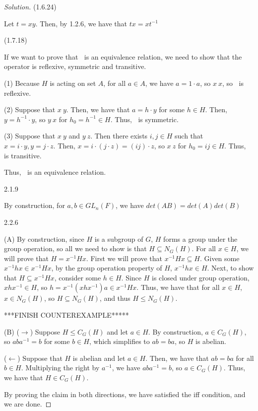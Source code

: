 \documentclass[11 pt]{article}
\theoremstyle{definition}
\theoremstyle{remark}
\newenvironment{solution}
  {\renewcommand\qedsymbol{$\blacksquare$}\begin{proof}[Solution]}
  {\end{proof}}
\begin{document}
\begin{solution}
(1.6.24)

Let $t = xy$. Then, by 1.2.6, we have that $tx = xt^{-1}$

(1.7.18)

If we want to prove that $~$ is an equivalence relation, we need to show that the operator is reflexive, symmetric and transitive. 

(1) Because $H$ is acting on set $A$, for all $a \in A$, we have $a = 1 \cdot a$, so $x ~ x$, so $~$ is reflexive.

(2) Suppose that $x ~ y$. Then, we have that $a = h \cdot y$ for some $h \in H$. Then, $y = h^{-1} \cdot y$, so $y ~ x$ for $h_0 = h ^{-1} \in H$. Thus, $~$ is symmetric.

(3) Suppose that $x ~ y$ and $y ~ z$. Then there exists $i,j \in H$ such that $x = i\cdot y, y = j \cdot z$. Then, $x = i \cdot (j \cdot z) = (ij) \cdot z$, so $x ~ z$ for $h_0 = ij \in H$. Thus, $~$ is transitive. 

Thus, $~$ is an equivalence relation.

2.1.9

By construction, for $a, b \in GL_n(F)$, we have $det(AB) = det(A)det(B)$

2.2.6

(A)
By construction, since $H$ is a subgroup of $G$, $H$ forms a group under the group operation, so all we need to show is that $H \subseteq N_G(H)$. For all $x \in H$, we will prove that $H = x^{-1}Hx$. First we will prove that $x^{-1}Hx \subseteq H$. Given some $x^{-1}hx \in x^{-1}Hx$, by the group operation property of $H$, $x^{-1}hx \in H$. Next, to show that $H \subseteq x^{-1}Hx$, consider some $h \in H$. Since $H$ is closed under group operation, $xhx^{-1} \in H$, so $h = x^{-1}(xhx^{-1})a \in x^{-1}Hx$. Thus, we have that for all $x \in H$, $x \in N_G(H)$, so $H \subseteq N_G(H)$, and thus $H \leq N_G(H)$. 

***FINISH COUNTEREXAMPLE*****

(B)
($\rightarrow$) Suppose $H \leq C_G(H)$ and let $a \in H$. By construction, $a \in C_G(H)$, so $aba^{-1}=b$ for some $b \in H$, which simplifies to $ab=ba$, so $H$ is abelian. 

($\leftarrow$) Suppose that $H$ is abelian and let $a \in H$. Then, we have that $ab=ba$ for all $b \in H$. Multiplying the right by $a^{-1}$, we have $aba^{-1}=b$, so $a \in C_G(H)$. Thus, we have that $H \in C_G(H)$.

By proving the claim in both directions, we have satisfied the iff condition, and we are done.


\end{solution}
\end{document}
